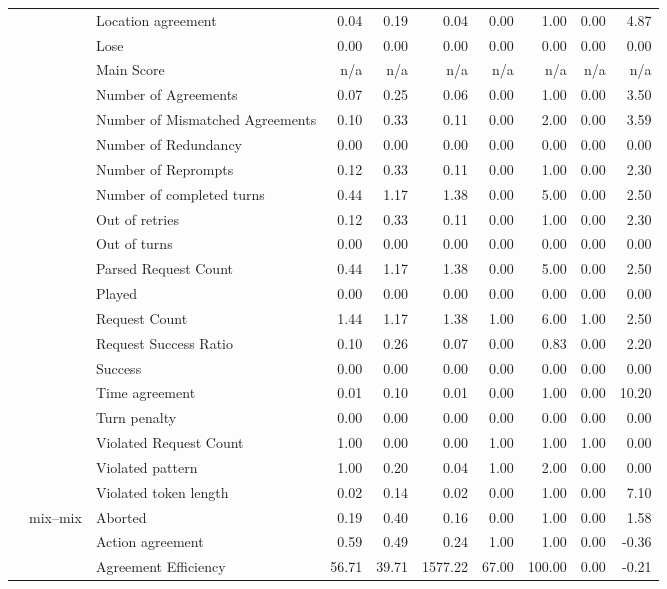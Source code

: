 \begin{tabular}{lllrrrrrrr}
 &  & Location agreement & 0.04 & 0.19 & 0.04 & 0.00 & 1.00 & 0.00 & 4.87 \\
 &  & Lose & 0.00 & 0.00 & 0.00 & 0.00 & 0.00 & 0.00 & 0.00 \\
 &  & Main Score & n/a & n/a & n/a & n/a & n/a & n/a & n/a \\
 &  & Number of Agreements & 0.07 & 0.25 & 0.06 & 0.00 & 1.00 & 0.00 & 3.50 \\
 &  & Number of Mismatched Agreements & 0.10 & 0.33 & 0.11 & 0.00 & 2.00 & 0.00 & 3.59 \\
 &  & Number of Redundancy & 0.00 & 0.00 & 0.00 & 0.00 & 0.00 & 0.00 & 0.00 \\
 &  & Number of Reprompts & 0.12 & 0.33 & 0.11 & 0.00 & 1.00 & 0.00 & 2.30 \\
 &  & Number of completed turns & 0.44 & 1.17 & 1.38 & 0.00 & 5.00 & 0.00 & 2.50 \\
 &  & Out of retries & 0.12 & 0.33 & 0.11 & 0.00 & 1.00 & 0.00 & 2.30 \\
 &  & Out of turns & 0.00 & 0.00 & 0.00 & 0.00 & 0.00 & 0.00 & 0.00 \\
 &  & Parsed Request Count & 0.44 & 1.17 & 1.38 & 0.00 & 5.00 & 0.00 & 2.50 \\
 &  & Played & 0.00 & 0.00 & 0.00 & 0.00 & 0.00 & 0.00 & 0.00 \\
 &  & Request Count & 1.44 & 1.17 & 1.38 & 1.00 & 6.00 & 1.00 & 2.50 \\
 &  & Request Success Ratio & 0.10 & 0.26 & 0.07 & 0.00 & 0.83 & 0.00 & 2.20 \\
 &  & Success & 0.00 & 0.00 & 0.00 & 0.00 & 0.00 & 0.00 & 0.00 \\
 &  & Time agreement & 0.01 & 0.10 & 0.01 & 0.00 & 1.00 & 0.00 & 10.20 \\
 &  & Turn penalty & 0.00 & 0.00 & 0.00 & 0.00 & 0.00 & 0.00 & 0.00 \\
 &  & Violated Request Count & 1.00 & 0.00 & 0.00 & 1.00 & 1.00 & 1.00 & 0.00 \\
 &  & Violated pattern & 1.00 & 0.20 & 0.04 & 1.00 & 2.00 & 0.00 & 0.00 \\
 &  & Violated token length & 0.02 & 0.14 & 0.02 & 0.00 & 1.00 & 0.00 & 7.10 \\
\cline{2-10}
 & \multirow[t]{27}{*}{mix--mix} & Aborted & 0.19 & 0.40 & 0.16 & 0.00 & 1.00 & 0.00 & 1.58 \\
 &  & Action agreement & 0.59 & 0.49 & 0.24 & 1.00 & 1.00 & 0.00 & -0.36 \\
 &  & Agreement Efficiency & 56.71 & 39.71 & 1577.22 & 67.00 & 100.00 & 0.00 & -0.21 \\

\end{tabular}
